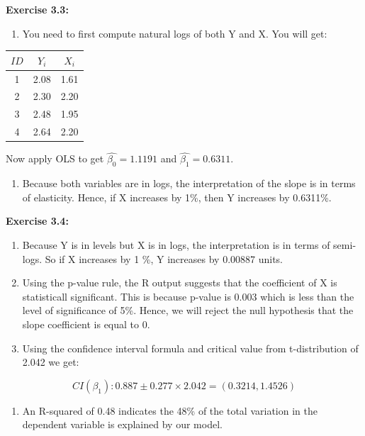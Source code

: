 \documentclass[
]{book}
\providecommand{\tightlist}{%
  \setlength{\itemsep}{0pt}\setlength{\parskip}{0pt}}
\theoremstyle{definition}
\theoremstyle{definition}
\theoremstyle{definition}
\theoremstyle{definition}
\theoremstyle{remark}
\begin{document}
\textbf{Exercise 3.3:}

\begin{enumerate}
\def\labelenumi{\alph{enumi}.}
\tightlist
\item
  You need to first compute natural logs of both Y and X. You will get:
\end{enumerate}

\begin{longtable}[]{@{}ccc@{}}
\toprule()
\(ID\) & \(Y_i\) & \(X_i\) \\
\midrule()
\endhead
1 & 2.08 & 1.61 \\
2 & 2.30 & 2.20 \\
3 & 2.48 & 1.95 \\
4 & 2.64 & 2.20 \\
\bottomrule()
\end{longtable}

Now apply OLS to get \(\widehat{\beta_0}=1.1191\) and \(\widehat{\beta_1}=0.6311\).

\begin{enumerate}
\def\labelenumi{\alph{enumi}.}
\setcounter{enumi}{1}
\tightlist
\item
  Because both variables are in logs, the interpretation of the slope is in terms of elasticity. Hence, if X increases by 1\%, then Y increases by 0.6311\%.
\end{enumerate}

\textbf{Exercise 3.4:}

\begin{enumerate}
\def\labelenumi{\alph{enumi}.}
\item
  Because Y is in levels but X is in logs, the interpretation is in terms of semi-logs. So if X increases by 1 \%, Y increases by 0.00887 units.
\item
  Using the p-value rule, the R output suggests that the coefficient of X is statisticall significant. This is because p-value is 0.003 which is less than the level of significance of 5\%. Hence, we will reject the null hypothesis that the slope coefficient is equal to 0.
\item
  Using the confidence interval formula and critical value from t-distribution of 2.042 we get:
\end{enumerate}

\[CI(\beta_1): 0.887 \pm 0.277 \times 2.042=(0.3214,1.4526)\]

\begin{enumerate}
\def\labelenumi{\alph{enumi}.}
\setcounter{enumi}{3}
\tightlist
\item
  An R-squared of 0.48 indicates the 48\% of the total variation in the dependent variable is explained by our model.
\end{enumerate}
\end{document}
